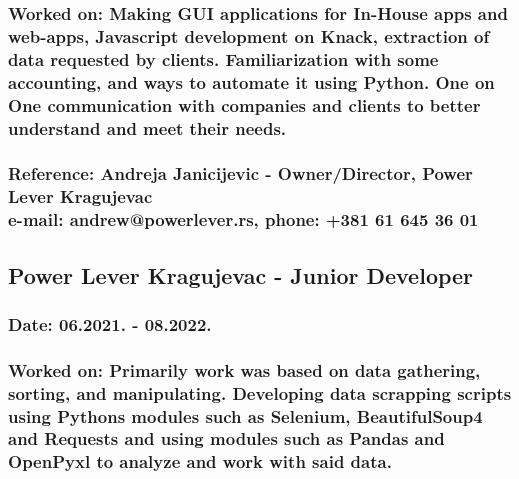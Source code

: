\documentclass{article}
\begin{document}
	\subsubsection{\large{Worked on:}\normalsize{ Making GUI applications for In-House apps  and web-apps, Javascript development on Knack, extraction of data requested by clients.
	Familiarization with some accounting, and ways to automate it using Python. One on One communication with companies and clients to better understand and meet their needs.}}
	\subsubsection{\large{Reference: Andreja Janicijevic}\normalsize{ - Owner/Director, Power Lever Kragujevac\\e-mail: andrew@powerlever.rs, phone: +381 61 645 36 01}}
	\subsection{\large{Power Lever Kragujevac - Junior Developer}}
	\subsubsection{\large{Date:}\normalsize{ 06.2021. - 08.2022.}}
	\subsubsection{\large{Worked on:}\normalsize{ Primarily work was based on data gathering, sorting, and manipulating. Developing data scrapping scripts using Pythons modules such as 
	Selenium, BeautifulSoup4 and Requests and using modules such as Pandas and OpenPyxl to analyze and work with said data.}}

	
	
	
\end{document}

